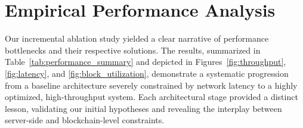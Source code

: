 \section{Empirical Performance Analysis}
\label{sec:results}


Our incremental ablation study yielded a clear narrative of performance bottlenecks and their respective solutions. The results, summarized in Table~\ref{tab:performance_summary} and depicted in Figures~\ref{fig:throughput}, \ref{fig:latency}, and \ref{fig:block_utilization}, demonstrate a systematic progression from a baseline architecture severely constrained by network latency to a highly optimized, high-throughput system. Each architectural stage provided a distinct lesson, validating our initial hypotheses and revealing the interplay between server-side and blockchain-level constraints.


\begin{table}[htbp]
    \centering
    \caption{Summary of Performance Metrics Across Architectural Stages}
    \label{tab:performance_summary}
\end{table}

